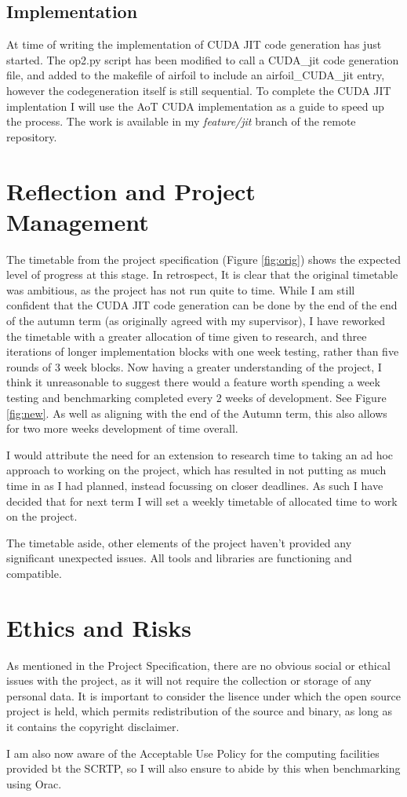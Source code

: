 \documentclass[11pt]{article}
\begin{document}
\subsection*{Implementation}
At time of writing the implementation of CUDA JIT code generation has just started. The op2.py script has been modified to call a CUDA\_jit code generation file, and added to the makefile of airfoil to include an airfoil\_CUDA\_jit entry, however the codegeneration itself is still sequential. To complete the CUDA JIT implentation I will use the AoT CUDA implementation as a guide to speed up the process. The work is available in my \textit{feature/jit} branch of the remote repository.

\section*{Reflection and Project Management}
The timetable from the project specification (Figure \ref{fig:orig}) shows the expected level of progress at this stage. In retrospect, It is clear that the original timetable was ambitious, as the project has not run quite to time. While I am still confident that the CUDA JIT code generation can be done by the end of the end of the autumn term (as originally agreed with my supervisor), I have reworked the timetable with a greater allocation of time given to research, and three iterations of longer implementation blocks with one week testing, rather than five rounds of 3 week blocks. Now having a greater understanding of the project, I think it unreasonable to suggest there would a feature worth spending a week testing and benchmarking completed every 2 weeks of development. See Figure \ref{fig:new}. As well as aligning with the end of the Autumn term, this also allows for two more weeks development of time overall.
\par I would attribute the need for an extension to research time to taking an ad hoc approach to working on the project, which has resulted in not putting as much time in as I had planned, instead focussing on closer deadlines. As such I have decided that for next term I will set a weekly timetable of allocated time to work on the project.
\par The timetable aside, other elements of the project haven't provided any significant unexpected issues. All tools and libraries are functioning and compatible.

\section*{Ethics and Risks}
As mentioned in the Project Specification, there are no obvious social or ethical issues with the project, as it will not require the collection or storage of any personal data. It is important to consider the lisence under which the open source project is held, which permits redistribution of the source and binary, as long as it contains the copyright disclaimer.
\par I am also now aware of the Acceptable Use Policy\cite{aup} for the computing facilities provided bt the SCRTP, so I will also ensure to abide by this when benchmarking using Orac.
\end{document}
